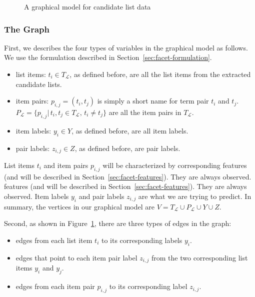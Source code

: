 \begin{figure}[ht!]
\centering
{}
\caption{A graphical model for candidate list data}
\label{fig:gm}
\end{figure}

\subsubsection{The Graph}
First, we describes the four types of variables in the graphical model as follows. We use the formulation described in Section~\ref{sec:facet-formulation}.
\begin{itemize}
 \item list items: $t_i \in T_\mathcal{L}$, as defined before, are all the list items from the extracted candidate lists.
 \item item pairs: $p_{i,j}=(t_i,t_j)$ is simply a short name for term pair $t_i$ and $t_j$. $P_{\mathcal{L}}=\{p_{i,j}|\, t_i,t_j\!\in\!T_{\mathcal{L}}, \, t_i \!\neq\! t_j \}$ are all the item pairs in $T_\mathcal{L}$.
 \item item labels: $y_i \in Y$, as defined before, are all item labels.
  \item pair labels: $z_{i,j} \in Z$, as defined before, are pair labels.
\end{itemize}
List items $t_i$ and item pairs $p_{i,j}$ will be characterized by corresponding features (and will be described in Section~\ref{sec:facet-features}). They are always observed. features (and will be described in Section~\ref{sec:facet-features}). They are always observed. Item labels $y_i$ and pair labels $z_{i,j}$ are what we are trying to predict. In summary, the vertices in our graphical model are $V=T_{\mathcal{L}} \cup P_{\mathcal{L}} \cup Y \cup Z$.

Second, as shown in Figure~\ref{fig:gm}, there are three types of edges in the graph:
\begin{itemize}
 \item edges from each list item $t_i$ to its corresponding labels $y_i$. 
 \item edges that point to each item pair label $z_{i,j}$ from the two corresponding list items $y_i$ and $y_j$.
 \item edges from each item pair $p_{i,j}$ to its corresponding label $z_{i,j}$.
\end{itemize}

